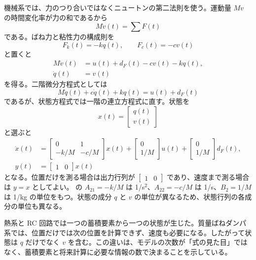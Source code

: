 機械系では、力のつり合いではなくニュートンの第二法則を使う。運動量 $Mv$ の時間変化率が力の和であるから
\begin{equation}
  M\dot{v}(t)=\sum F(t)
\end{equation}
である。ばね力と粘性力の構成則を
\begin{equation}
  F_k(t)=-kq(t),\qquad F_c(t)=-cv(t)
\end{equation}
と置くと
\begin{align}
  M\dot{v}(t)&=u(t)+d_F(t)-cv(t)-kq(t),\\
  \dot{q}(t)&=v(t)
\end{align}
を得る。二階微分方程式としては
\begin{equation}
  M\ddot{q}(t)+c\dot{q}(t)+kq(t)=u(t)+d_F(t)
\end{equation}
であるが、状態方程式では一階の連立方程式に直す。状態を
\begin{equation}
  x(t)=\begin{bmatrix}q(t)\\ v(t)\end{bmatrix}
\end{equation}
と選ぶと
\begin{align}
  \dot{x}(t)
  &=\begin{bmatrix}
      0&1\\
      -k/M&-c/M
    \end{bmatrix}x(t)
    +\begin{bmatrix}
      0\\
      1/M
    \end{bmatrix}u(t)
    +\begin{bmatrix}
      0\\
      1/M
    \end{bmatrix}d_F(t),\label{eq:physical-modeling-msd-state}\\
  y(t)&=\begin{bmatrix}1&0\end{bmatrix}x(t)
\end{align}
となる。位置だけを測る場合は出力行列が $\begin{bmatrix}1&0\end{bmatrix}$ であり、速度まで測る場合は $y=x$ としてよい。 の $A_{21}=-k/M$ は 1/s$^2$、$A_{22}=-c/M$ は 1/s、$B_2=1/M$ は 1/kg の単位をもつ。状態の成分 $q$ と $v$ の単位が異なるため、状態行列の各成分の単位も異なる。

熱系と RC 回路では一つの蓄積要素から一つの状態が生じた。質量ばねダンパ系では、位置だけでは次の位置を計算できず、速度も必要になる。したがって状態は $q$ だけでなく $v$ を含む。この違いは、モデルの次数が「式の見た目」ではなく、蓄積要素と将来計算に必要な情報の数で決まることを示している。

